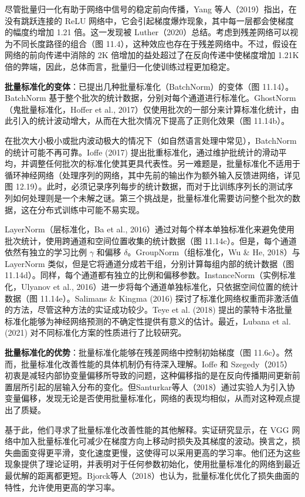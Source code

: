 \documentclass[lang=cn,newtx,10pt,scheme=chinese]{elegantbook}
\begin{document}
尽管批量归一化有助于网络中信号的稳定前向传播，Yang 等人（2019）指出，在没有跳跃连接的 ReLU 网络中，它会引起梯度爆炸现象，其中每一层都会使梯度的幅度约增加 1.21 倍。这一发现被 Luther（2020）总结。考虑到残差网络可以视为不同长度路径的组合（图 11.4），这种效应也存在于残差网络中。不过，假设在网络的前向传递中消除的 2K 倍增加的益处超过了在反向传递中使梯度增加 1.21K 倍的弊端，因此，总体而言，批量归一化使训练过程更加稳定。

\textbf{批量标准化的变体}：已提出几种批量标准化（BatchNorm）的变体（图 11.14）。BatchNorm 基于整个批次的统计数据，分别对每个通道进行标准化。GhostNorm（鬼批量标准化，Hoffer et al., 2017）仅使用批次的一部分来计算标准化统计，由此引入的统计波动增大，从而在大批次情况下提高了正则化效果（图 11.14b）。

在批次大小极小或批内波动极大的情况下（如自然语言处理中常见），BatchNorm 的统计可能不再可靠。Ioffe (2017) 提出批重标准化，通过维护批统计的滑动平均，并调整任何批次的标准化使其更具代表性。另一难题是，批量标准化不适用于循环神经网络（处理序列的网络，其中先前的输出作为额外输入反馈进网络，详见图 12.19）。此时，必须记录序列每步的统计数据，而对于比训练序列长的测试序列如何处理则是一个未解之谜。第三个挑战是，批量标准化需要访问整个批次的数据，这在分布式训练中可能不易实现。

LayerNorm（层标准化，Ba et al., 2016）通过对每个样本单独标准化来避免使用批次统计，使用跨通道和空间位置收集的统计数据（图 11.14c）。但是，每个通道依然有独立的学习比例 \(\gamma\) 和偏移 \(\delta\)。GroupNorm（组标准化，Wu \& He, 2018）与LayerNorm 类似，但是它将通道分成若干组，分别计算每组内部的统计数据（图 11.14d）。同样，每个通道都有独立的比例和偏移参数。InstanceNorm（实例标准化，Ulyanov et al., 2016）进一步将每个通道单独标准化，只依据空间位置的统计数据（图 11.14e）。Salimans \& Kingma (2016) 探讨了标准化网络权重而非激活值的方法，尽管这种方法的实证成功较少。Teye et al. (2018) 提出的蒙特卡洛批量标准化能够为神经网络预测的不确定性提供有意义的估计。最近，Lubana et al. (2021) 对不同标准化方案的性质进行了比较研究。

\textbf{批量标准化的优势}：批量标准化能够在残差网络中控制初始梯度（图 11.6c）。然而，批量标准化改善性能的具体机制仍有待深入理解。Ioffe 和 Szegedy（2015）初衷是减轻内部协变量偏移所导致的问题，这种偏移指的是在反向传播期间更新前置层所引起的层输入分布的变化。但Santurkar等人（2018）通过实验人为引入协变量偏移，发现无论是否使用批量标准化，网络的表现均相似，从而对这种观点提出了质疑。

基于此，他们寻求了批量标准化改善性能的其他解释。实证研究显示，在 VGG 网络中加入批量标准化可减少在梯度方向上移动时损失及其梯度的波动。换言之，损失曲面变得更平滑，变化速度更慢，这使得可以采用更高的学习率。他们还为这些现象提供了理论证明，并表明对于任何参数初始化，使用批量标准化的网络到最近最优解的距离都更短。Bjorck等人（2018）也认为，批量标准化优化了损失曲面的特性，允许使用更高的学习率。
\end{document}
